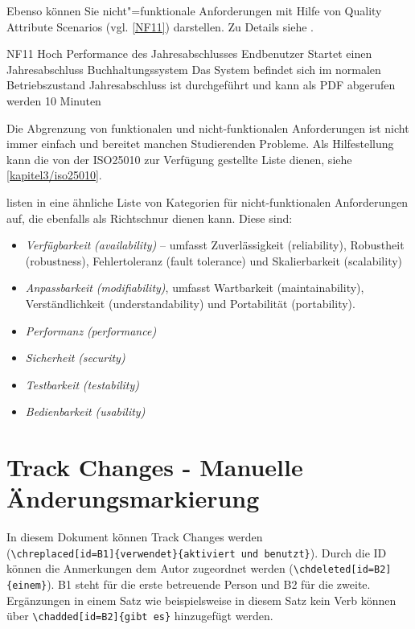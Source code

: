Ebenso können Sie nicht"=funktionale Anforderungen mit Hilfe von Quality Attribute Scenarios (vgl. \autoref{NF11}) darstellen. Zu Details siehe \autocite{Barbacci2003}.

\qas %
   {NF11} %
   {Hoch} %
   {Performance des Jahresabschlusses} %
   {Endbenutzer} %
   {Startet einen Jahresabschluss} %
   {Buchhaltungssystem} %
   {Das System befindet sich im normalen Betriebszustand} %
   {Jahresabschluss ist durchgeführt und kann als PDF abgerufen werden} %
   {10 Minuten} %

Die Abgrenzung von funktionalen und nicht-funktionalen Anforderungen ist nicht immer einfach und bereitet manchen Studierenden Probleme. Als Hilfestellung kann die von der ISO25010 \autocite{ISO25010} zur Verfügung gestellte Liste dienen, siehe \autoref{kapitel3/iso25010}.


\citeauthor{Bass2021} listen in \autocite{Bass2021} eine ähnliche Liste von Kategorien für nicht-funktionalen Anforderungen auf, die ebenfalls als Richtschnur dienen kann. Diese sind:

\begin{itemize}
  \item \textit{Verfügbarkeit} \textit{(availability)} -- umfasst Zuverlässigkeit (reliability), Robustheit (robustness), Fehlertoleranz (fault tolerance) und Skalierbarkeit (scalability)
  \item \textit{Anpassbarkeit} \textit{(modifiability)}, umfasst Wartbarkeit (maintainability), Verständlichkeit (understandability) und Portabilität (portability).
  \item \textit{Performanz} \textit{(performance)}
  \item \textit{Sicherheit} \textit{(security)}
  \item \textit{Testbarkeit} \textit{(testability)}
  \item \textit{Bedienbarkeit} \textit{(usability)}
\end{itemize}


\chapter{Track Changes - Manuelle Änderungsmarkierung}
In diesem Dokument können Track Changes  werden\\ (\lstinline|\chreplaced[id=B1]{verwendet}{aktiviert und benutzt}|). Durch die ID können die Anmerkungen  dem Autor zugeordnet werden (\verb|\chdeleted[id=B2]{einem}|). B1 steht für die erste betreuende Person und B2 für die zweite. Ergänzungen in einem Satz wie beispielsweise in diesem Satz  kein Verb können über \lstinline|\chadded[id=B2]{gibt es}| hinzugefügt werden.  

